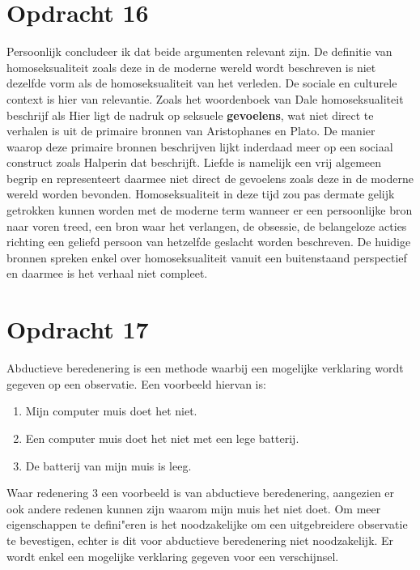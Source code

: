 \documentclass[10pt]{amsart}
\begin{document}
\section*{Opdracht 16}
Persoonlijk concludeer ik dat beide argumenten relevant zijn. De definitie van homoseksualiteit zoals deze in de moderne wereld wordt beschreven is niet dezelfde vorm als de homoseksualiteit van het verleden. De sociale
en culturele context is hier van relevantie.
Zoals het woordenboek van Dale\autocite{Homoseksueel2023} homoseksualiteit beschrijf als  Hier ligt de nadruk op seksuele \textbf{gevoelens}, wat niet direct te verhalen is uit de primaire bronnen van Aristophanes\autocite{aristophanesKikkers405} en Plato\autocite{platoSymposium189d-193a}. De manier waarop deze primaire bronnen  beschrijven lijkt inderdaad meer op een sociaal construct zoals Halperin\autocite{halperinThereHistorySexuality1989} dat beschrijft. Liefde is namelijk een vrij algemeen begrip en representeert daarmee niet direct de gevoelens zoals deze in de moderne wereld worden bevonden. Homoseksualiteit in deze tijd zou pas dermate gelijk getrokken kunnen worden met de moderne term wanneer er een persoonlijke bron naar voren treed, een bron waar het verlangen, de obsessie, de belangeloze acties richting een geliefd persoon van hetzelfde geslacht worden beschreven. De huidige bronnen spreken enkel over homoseksualiteit vanuit een buitenstaand perspectief en daarmee is het verhaal niet compleet.

\section*{Opdracht 17}
Abductieve beredenering is een methode waarbij een mogelijke verklaring wordt gegeven op een observatie. Een voorbeeld hiervan is:
\begin{enumerate}
     \item Mijn computer muis doet het niet.
     \item Een computer muis doet het niet met een lege batterij.
     \item De batterij van mijn muis is leeg.
\end{enumerate}
Waar redenering 3 een voorbeeld is van abductieve beredenering, aangezien er ook andere redenen kunnen zijn waarom mijn muis het niet doet. Om meer eigenschappen te defini"eren is het noodzakelijke om een uitgebreidere observatie te bevestigen, echter is dit voor abductieve beredenering niet noodzakelijk. Er wordt enkel een mogelijke verklaring gegeven voor een verschijnsel.
\end{document}
